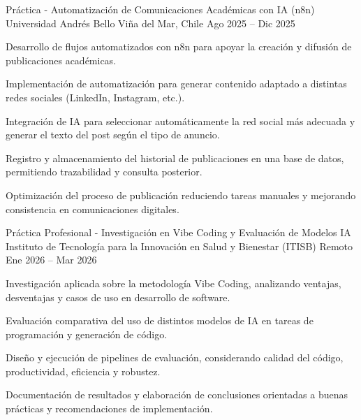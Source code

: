 
\begin{cventries}

\cventry
  {Práctica - Automatización de Comunicaciones Académicas con IA (n8n)}
  {Universidad Andrés Bello}
  {Viña del Mar, Chile}
  {Ago 2025 -- Dic 2025}
  {
    \begin{cvitems}
      \item {Desarrollo de flujos automatizados con n8n para apoyar la creación y difusión de publicaciones académicas.}
      \item {Implementación de automatización para generar contenido adaptado a distintas redes sociales (LinkedIn, Instagram, etc.).}
      \item {Integración de IA para seleccionar automáticamente la red social más adecuada y generar el texto del post según el tipo de anuncio.}
      \item {Registro y almacenamiento del historial de publicaciones en una base de datos, permitiendo trazabilidad y consulta posterior.}
      \item {Optimización del proceso de publicación reduciendo tareas manuales y mejorando consistencia en comunicaciones digitales.}
    \end{cvitems}
    \vspace{5mm}
  }

\cventry
  {Práctica Profesional - Investigación en Vibe Coding y Evaluación de Modelos IA}
  {Instituto de Tecnología para la Innovación en Salud y Bienestar (ITISB)}
  {Remoto}
  {Ene 2026 -- Mar 2026}
  {
    \begin{cvitems}
      \item {Investigación aplicada sobre la metodología Vibe Coding, analizando ventajas, desventajas y casos de uso en desarrollo de software.}
      \item {Evaluación comparativa del uso de distintos modelos de IA en tareas de programación y generación de código.}
      \item {Diseño y ejecución de pipelines de evaluación, considerando calidad del código, productividad, eficiencia y robustez.}
      \item {Documentación de resultados y elaboración de conclusiones orientadas a buenas prácticas y recomendaciones de implementación.}
    \end{cvitems}
    \vspace{5mm}
  }
\end{cventries}